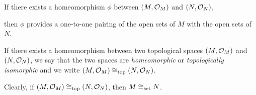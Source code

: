 If there exists a homeomorphism $\phi$ between $(M,\mathcal{O}_M)$ and $(N,\mathcal{O}_N)$,

\bse
{}
\ese

then $\phi$ provides a one-to-one pairing of the open sets of $M$ with the open sets of $N$.

\bd
If there exists a homeomorphism between two topological spaces $(M,\mathcal{O}_M)$ and $(N,\mathcal{O}_N)$, we say that the two spaces are \emph{homeomorphic} or \emph{topologically isomorphic} and we write $(M,\mathcal{O}_M) \cong_\mathrm{top} (N,\mathcal{O}_N)$.
\ed

Clearly, if $(M,\mathcal{O}_M) \cong_\mathrm{top} (N,\mathcal{O}_N)$, then $M \cong_\mathrm{set} N$.




















